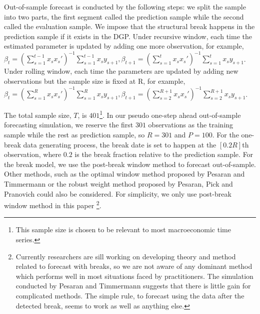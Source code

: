 \documentclass[a4paper,12pt]{article}
\begin{document}
Out-of-sample forecast is conducted by the following steps: we split the sample into two parts, the first segment called the prediction sample while the second called the evaluation sample. We impose that the structural break happens in the prediction sample if it exists in the DGP. Under recursive window, each time the estimated parameter is updated by adding one more observation, for example, $\beta_{t} = (\sum_{s=1}^{t-1} x_{s} x_{s}')^{-1}\sum_{s=1}^{t-1}x_{s}y_{s+1},\beta_{t+1} = (\sum_{s=1}^{t} x_{s} x_{s}')^{-1}\sum_{s=1}^{t}x_{s}y_{s+1}$. Under rolling window, each time the parameters are updated by adding new observations but the sample size is fixed at R, for example, $\beta_{t} = (\sum_{s=1}^{R} x_{s} x_{s}')^{-1}\sum_{s=1}^{R}x_{s}y_{s+1},\beta_{t+1} = (\sum_{s=2}^{R+1} x_{s} x_{s}')^{-1}\sum_{s=2}^{R+1}x_{s}y_{s+1}$.

The total sample size, $T$, is $401$\footnote{This sample size is chosen to be relevant to most macroeconomic time series.}. In our pseudo one-step ahead out-of-sample forecasting simulation, we reserve the first $301$ observations as the training sample while the rest as prediction sample, so $R=301$ and $P=100$. For the one-break data generating process, the break date is set to happen at the $[0.2R]$th observation, where $0.2$ is the break fraction relative to the prediction sample. For the break model, we use the post-break window method to forecast out-of-sample. Other methods, such as the optimal window method proposed by Pesaran and Timmermann \cite{pesaran_timmermann_JE2007} or the robust weight method proposed by Pesaran, Pick and Pranovich \cite{pesaran_pick_pranovich_2011} could also be considered. For simplicity, we only use post-break window method in this paper \footnote{Currently researchers are sill working on developing theory and method related to forecast with breaks, so we are not aware of any dominant method which performs well in most situations faced by practitioners. The simulation conducted by Pesaran and Timmermann suggests that there is little gain for complicated methods. The simple rule, to forecast using the data after the detected break, seems to work as well as anything else.}.
\end{document}
